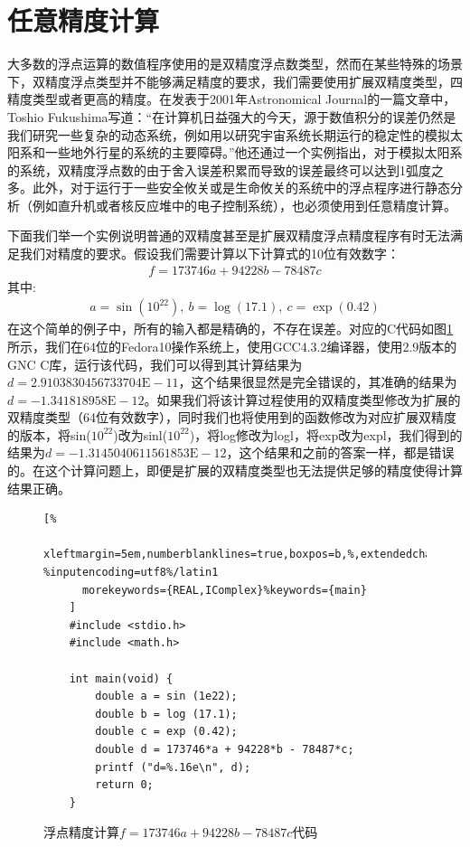 \section{任意精度计算}

大多数的浮点运算的数值程序使用的是双精度浮点数类型，然而在某些特殊的场景下，双精度浮点类型并不能够满足精度的要求，我们需要使用扩展双精度类型，四精度类型或者更高的精度。在发表于2001年Astronomical Journal的一篇文章中\cite{1538-3881-122-1-482}，Toshio Fukushima写道：“在计算机日益强大的今天，源于数值积分的误差仍然是我们研究一些复杂的动态系统，例如用以研究宇宙系统长期运行的稳定性的模拟太阳系和一些地外行星的系统的主要障碍。”他还通过一个实例指出，对于模拟太阳系的系统，双精度浮点数的由于舍入误差积累而导致的误差最终可以达到1弧度之多。此外，对于运行于一些安全攸关或是生命攸关的系统中的浮点程序进行静态分析（例如直升机或者核反应堆中的电子控制系统），也必须使用到任意精度计算。

下面我们举一个实例说明普通的双精度甚至是扩展双精度浮点精度程序有时无法满足我们对精度的要求。假设我们需要计算以下计算式的10位有效数字：
\begin{align*}
    f = 173746a + 94228b - 78487c
\end{align*}
其中:
\begin{align*} 
    a = \sin(10^{22}),\ b = \log(17.1),\ c = \exp(0.42)
\end{align*}
在这个简单的例子中，所有的输入都是精确的，不存在误差。对应的C代码如图\ref{lst:arbiexcode}所示，我们在64位的Fedora10操作系统上，使用GCC4.3.2编译器，使用2.9版本的GNC C库，运行该代码，我们可以得到其计算结果为$d = 2.9103830456733704\text{E}-11$，这个结果很显然是完全错误的，其准确的结果为$d = −1.341818958\text{E}−12$。如果我们将该计算过程使用的双精度类型修改为扩展的双精度类型（64位有效数字），同时我们也将使用到的函数修改为对应扩展双精度的版本，将sin($10^{22}$)改为sinl($10^{22}$)，将log修改为logl，将exp改为expl，我们得到的结果为$d=-1.3145040611561853\text{E}−12$，这个结果和之前的答案一样，都是错误的。在这个计算问题上，即便是扩展的双精度类型也无法提供足够的精度使得计算结果正确。

\begin{figure}[thbp]
    \begin{lstlisting}[%
      xleftmargin=5em,numberblanklines=true,boxpos=b,%,extendedchars=\true, %inputencoding=utf8%/latin1
      morekeywords={REAL,IComplex}%keywords={main}
    ]
    #include <stdio.h>
    #include <math.h>

    int main(void) {
        double a = sin (1e22);
        double b = log (17.1);
        double c = exp (0.42); 
        double d = 173746*a + 94228*b - 78487*c; 
        printf ("d=%.16e\n", d); 
        return 0;
    }

    \end{lstlisting}
    \caption{浮点精度计算$f = 173746a + 94228b - 78487c$代码}
    \label{lst:arbiexcode}
\end{figure}

